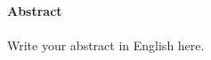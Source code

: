 \thispagestyle{empty}
{\noindent\large\textbf{Abstract}}
\\ \\
{\linespread{1.}\small
\noindent Write your abstract in English here.  
\vfill
\noindent
}